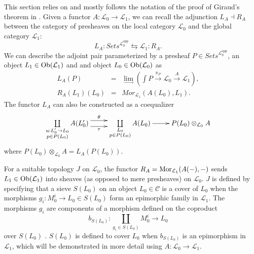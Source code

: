 \documentclass[aps,twocolumn]{revtex4-1}
\begin{document}
This section relies on and mostly follows the notation of the proof of Giraud's theorem in \cite{MacLane1992}. Given a functor $A: \mathcal{L}_0 \rightarrow \mathcal{L}_1$, we can recall the adjunction $L_A \dashv R_A$ between the category of presheaves on the local category $\mathcal{L}_0$ and the global category $\mathcal{L}_1$:
$$
L_A: \textit{Sets}^{\mathcal{L}_0^{opp}} \leftrightarrows \mathcal{L}_1 :R_A.
$$
We can describe the adjoint pair parameterized by a presheaf $P \in \textit{Sets}^{\mathcal{L}_0^{opp}}$, an object $L_1 \in \mathop{\rm Ob}\nolimits(\mathcal{L}_1)$ and and object $L_0 \in \mathop{\rm Ob}\nolimits(\mathcal{L}_0)$ as
\begin{eqnarray*}
L_A(P) &=& \lim\limits_{\longrightarrow} \left( \int P \xrightarrow{\pi_P} \mathcal{L}_0 \xrightarrow{A} \mathcal{L}_1 \right),\\
R_A(L_1)(L_0) &=& Mor_{\mathcal{L}_1}(A(L_0),L_1).
\end{eqnarray*}
The functor $L_A$ can also be constructed as a coequalizer
\begin{displaymath}
\xymatrix{
\coprod\limits_{\substack{u : L'_0 \rightarrow L_0 \\ p \in P(L_0)}}
A(L'_0)
\ar@<1ex>[r]^-{\theta} \ar@<-1ex>[r]_-{\tau}
&
\coprod\limits_{\substack{L_0 \\ p \in P(L_0)}}
A(L_0)
\ar[r]
&
P(L_0) \otimes_{\mathcal{L}_0} A
}
\end{displaymath}
where $P(L_0) \otimes_{\mathcal{L}_0} A = L_A(P(L_0))$.

For a suitable topology $J$ on $\mathcal{L}_0$, the functor $R_A = \mathop{\rm Mor}\nolimits_{\mathcal{L}_1}(A(-),-)$ sends $L_1 \in \mathop{\rm Ob}\nolimits(\mathcal{L}_1)$ into sheaves (as opposed to mere presheaves) on $\mathcal{L}_0$. $J$ is defined by specifying that a sieve $S(L_0)$ on an object $L_0 \in \mathcal{C}$ is a cover of $L_0$ when the morphisms $g_i : M_0^i \rightarrow L_0 \in S(L_0)$ form an epimorphic family in $\mathcal{L}_1$. The morphisms $g_i$ are components of a morphism defined on the coproduct
$$
b_{S(L_0)} : \coprod\limits_{g_i \in S(L_0)} M_0^i \longrightarrow L_0
$$
over $S(L_0)$ . $S(L_0)$ is defined to cover $L_0$ when $b_{S(L_0)}$ is an epimorphism in $\mathcal{L}_1$, which will be demonstrated in more detail using $A:\mathcal{L}_0 \rightarrow \mathcal{L}_1$.
\end{document}
